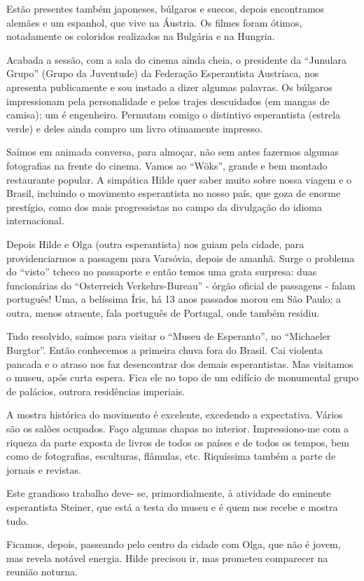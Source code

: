 Estão presentes também japoneses, búlgaros e suecos, depois encontramos alemães e um espanhol, que vive na Áustria. Os filmes foram ótimos, notadamente os coloridos realizados na Bulgária e na Hungria.

Acabada a sessão, com a sala do cinema ainda cheia, o presidente da “Junulara Grupo” (Grupo da Juventude) da Federação Esperantista Austríaca, nos apresenta publicamente e sou instado a dizer algumas palavras. Os búlgaros impressionam pela personalidade e pelos trajes descuidados (em mangas de camisa); um é engenheiro. Permutam comigo o distintivo esperantista (estrela verde) e deles ainda compro um livro otimamente impresso.

Saímos em animada conversa, para almoçar, não sem antes fazermos algumas fotografias na frente do cinema. Vamos ao “Wöks”, grande e bem montado restaurante popular. A simpática Hilde quer saber muito sobre nossa viagem e o Brasil, incluindo o movimento esperantista no nosso país, que goza de enorme prestígio, como dos mais progressistas no campo da divulgação do idioma internacional.

Depois Hilde e Olga (outra esperantista) nos guiam pela cidade, para providenciarmos a passagem para Varsóvia, depois de amanhã. Surge o problema do “visto” tcheco no passaporte e então temos uma grata surpresa: duas funcionárias do “Osterreich Verkehrs-Bureau” - órgão oficial de passagens - falam português! Uma, a belíssima Íris, há 13 anos passados morou em São Paulo; a outra, menos atraente, fala português de Portugal, onde também residiu.

Tudo resolvido, saímos para visitar o “Museu de Esperanto”, no “Michaeler Burgtor”. Então conhecemos a primeira chuva fora do Brasil. Cai violenta pancada e o atraso nos faz desencontrar dos demais esperantistas. Mas visitamos o museu, após curta espera. Fica ele no topo de um edifício de monumental grupo de palácios, outrora residências imperiais.

A mostra histórica do movimento é excelente, excedendo a expectativa. Vários são os salões ocupados. Faço algumas chapas no interior. Impressiono-me com a riqueza da parte exposta de livros de todos os países e de todos os tempos, bem como de fotografias, esculturas, flâmulas, etc. Riquíssima também a parte de jornais e revistas.

Este grandioso trabalho deve- se, primordialmente, à atividade do eminente esperantista Steiner, que está a testa do museu e é quem nos recebe e mostra tudo.

Ficamos, depois, passeando pelo centro da cidade com Olga, que não é jovem, mas revela notável energia. Hilde precisou ir, mas prometeu comparecer na reunião noturna.

